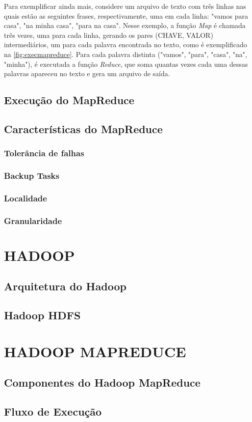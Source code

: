 Para exemplificar ainda mais, considere um arquivo de texto com três linhas nas quais estão as seguintes frases, respectivamente, uma em cada linha: "vamos para casa", "na minha casa", "para na casa". Nesse exemplo, a função \textit{Map} é chamada três vezes, uma para cada linha, gerando os pares (CHAVE, VALOR) intermediários, um para cada palavra encontrada no texto, como é exemplificado na \autoref{fig:execmapreduce}. Para cada palavra distinta ("vamos", "para", "casa", "na", "minha"), é executada a função \textit{Reduce}, que soma quantas vezes cada uma dessas palavras apareceu no texto e gera um arquivo de saída.


\subsection{Execução do MapReduce}\label{ssec:execucaomapreduce}

\subsection{Características do MapReduce}\label{ssec:caracteristicasmapreduce}
\subsubsection{Tolerância de falhas}\label{sssec:toleranciafalhas}
\subsubsection{Backup Tasks}\label{sssec:backuptasks}
\subsubsection{Localidade}\label{sssec:localidade}
\subsubsection{Granularidade}\label{sssec:granularidade}


\section{HADOOP} \label{sec:hadoop}

\subsection{Arquitetura do Hadoop}\label{ssec:arquiteturahadoop}
\subsection{Hadoop HDFS}\label{ssec:hadoophdfs}

\section{HADOOP MAPREDUCE} \label{sec:hadoopmapreduce}
\subsection{Componentes do Hadoop MapReduce}\label{ssec:componentehmp}
\subsection{Fluxo de Execução}\label{ssec:fluxoexecucaohmp}